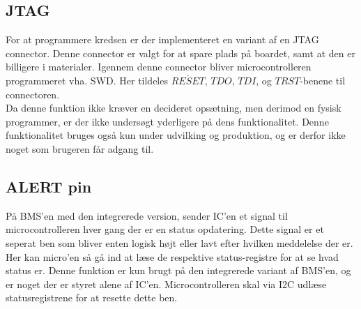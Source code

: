 \subsection{JTAG}
For at programmere kredsen er der implementeret en variant af en JTAG connector. Denne connector er valgt for at spare plads på boardet, samt at den er billigere i materialer. Igennem denne connector bliver microcontrolleren programmeret vha. SWD. Her tildeles $\overline{RESET}$, $TDO$, $TDI$, og $TRST$-benene til connectoren. \\

Da denne funktion ikke kræver en decideret opsætning, men derimod en fysisk programmer, er der ikke undersøgt yderligere på dens funktionalitet. Denne funktionalitet bruges også kun under udvilking og produktion, og er derfor ikke noget som brugeren får adgang til. 

\subsection{ALERT pin}
På BMS'en med den integrerede version, sender IC'en et signal til microcontrolleren hver gang der er en status opdatering. Dette signal er et seperat ben som bliver enten logisk højt eller lavt efter hvilken meddelelse der er. Her kan micro'en så gå ind at læse de respektive status-registre for at se hvad status er. Denne funktion er kun brugt på den integrerede variant af BMS'en, og er noget der er styret alene af IC'en. Microcontrolleren skal via I2C udlæse statusregistrene for at resette dette ben. 

